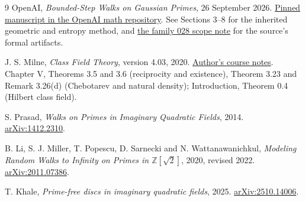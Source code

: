 \documentclass[11pt]{article}
\numberwithin{equation}{section}
\theoremstyle{definition}\newtheorem{definition}[theorem]{Definition}
\theoremstyle{remark}\newtheorem{remark}[theorem]{Remark}
\newcommand{\Z}{\mathbb Z}\newcommand{\Q}{\mathbb Q}\newcommand{\R}{\mathbb R}
\begin{document}
\begin{thebibliography}{9}
OpenAI, \emph{Bounded-Step Walks on Gaussian Primes}, 26 September 2026.
\href{https://github.com/openai/math/blob/adc7f1241b42e322a6451854ab7e4b4c146bf78a/preprints/Bounded-Step-Walks-on-Gaussian-Primes-September-26-2026/paper.pdf}{Pinned manuscript in the OpenAI math repository}.
See Sections 3--8 for the inherited geometric and entropy method, and
\href{https://github.com/openai/math/blob/adc7f1241b42e322a6451854ab7e4b4c146bf78a/lean/docs/028.md}{the family 028 scope note} for the source's formal artifacts.

J. S. Milne, \emph{Class Field Theory}, version 4.03, 2020.
\href{https://www.jmilne.org/math/CourseNotes/CFT.pdf}{Author's course notes}.
Chapter V, Theorems 3.5 and 3.6 (reciprocity and existence), Theorem 3.23 and Remark 3.26(d) (Chebotarev and natural density); Introduction, Theorem 0.4 (Hilbert class field).

S. Prasad, \emph{Walks on Primes in Imaginary Quadratic Fields}, 2014.
\href{https://arxiv.org/abs/1412.2310}{arXiv:1412.2310}.

B. Li, S. J. Miller, T. Popescu, D. Sarnecki and N. Wattanawanichkul,
\emph{Modeling Random Walks to Infinity on Primes in $\Z[\sqrt2]$}, 2020, revised 2022.
\href{https://arxiv.org/abs/2011.07386}{arXiv:2011.07386}.

T. Khale, \emph{Prime-free discs in imaginary quadratic fields}, 2025.
\href{https://arxiv.org/abs/2510.14006}{arXiv:2510.14006}.
\end{thebibliography}
\end{document}
